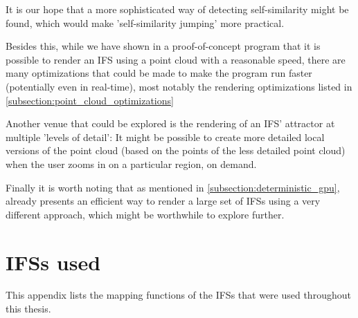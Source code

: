\documentclass[11pt]{article}
\begin{document}
It is our hope that a more sophisticated way of detecting self-similarity might be found,
which would make 'self-similarity jumping' more practical.

Besides this, while we have shown in a proof-of-concept program that it is possible to render an IFS using a point cloud
with a reasonable speed, there are many optimizations that could be made to make the program run faster (potentially even in real-time),
most notably the rendering optimizations listed in \autoref{subsection:point_cloud_optimizations}

Another venue that could be explored is the rendering of an IFS' attractor at multiple 'levels of detail':
It might be possible to create more detailed local versions of the point cloud (based on the points of the less detailed point cloud) when the user
zooms in on a particular region, on demand.

Finally it is worth noting that as mentioned in \autoref{subsection:deterministic_gpu}, \cite{lawlor2012gpu} already presents an efficient way to render a large set of IFSs using a very different approach, 
which might be worthwhile to explore further.

\pagebreak
\printbibliography
\clearpage

\appendix

\section{IFSs used}
\label{sec:orgd0fd36b}

This appendix lists the mapping functions of the IFSs that were used throughout this thesis.

\end{document}
